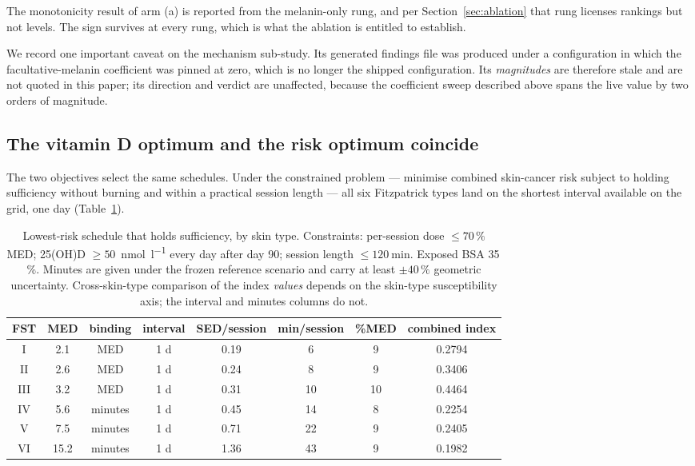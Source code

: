 \documentclass[11pt]{article}
\newcommand{\nmol}{\si{\nano\mole\per\litre}}
\newcommand{\SED}{SED}
\begin{document}
The monotonicity result of arm (a) is reported from the melanin-only
rung, and per Section~\ref{sec:ablation} that rung licenses rankings
but not levels. The sign survives at every rung, which is what the
ablation is entitled to establish.

We record one important caveat on the mechanism sub-study. Its
generated findings file was produced under a configuration in which
the facultative-melanin coefficient was pinned at zero, which is no
longer the shipped configuration. Its \emph{magnitudes} are therefore
stale and are not quoted in this paper; its direction and verdict are
unaffected, because the coefficient sweep described above spans the
live value by two orders of magnitude.

\subsection{The vitamin D optimum and the risk optimum coincide}

The two objectives select the same schedules. Under the constrained
problem --- minimise combined skin-cancer risk subject to holding
sufficiency without burning and within a practical session length ---
all six Fitzpatrick types land on the shortest interval available on
the grid, one day (Table~\ref{tab:riskaware}).

\begin{table}[htbp]
\centering
\caption{Lowest-risk schedule that holds sufficiency, by skin type.
Constraints: per-session dose $\le 70\,\%$ MED; 25(OH)D $\ge 50$~\nmol{}
every day after day 90; session length $\le \SI{120}{\minute}$.
Exposed BSA 35\,\%. Minutes are given under the frozen reference
scenario and carry at least $\pm40\,\%$ geometric uncertainty.
Cross-skin-type comparison of the index \emph{values} depends on the
skin-type susceptibility axis; the interval and minutes columns do
not.}
\label{tab:riskaware}
\small
\begin{tabular}{cccccccc}
\toprule
FST & MED & binding & interval & \SED/session & min/session & \%MED & combined index \\
\midrule
I   & 2.1  & MED     & 1 d & 0.19 & 6  & 9 & 0.2794 \\
II  & 2.6  & MED     & 1 d & 0.24 & 8  & 9 & 0.3406 \\
III & 3.2  & MED     & 1 d & 0.31 & 10 & 10 & 0.4464 \\
IV  & 5.6  & minutes & 1 d & 0.45 & 14 & 8  & 0.2254 \\
V   & 7.5  & minutes & 1 d & 0.71 & 22 & 9 & 0.2405 \\
VI  & 15.2 & minutes & 1 d & 1.36 & 43 & 9 & 0.1982 \\
\bottomrule
\end{tabular}
\end{table}
\end{document}
